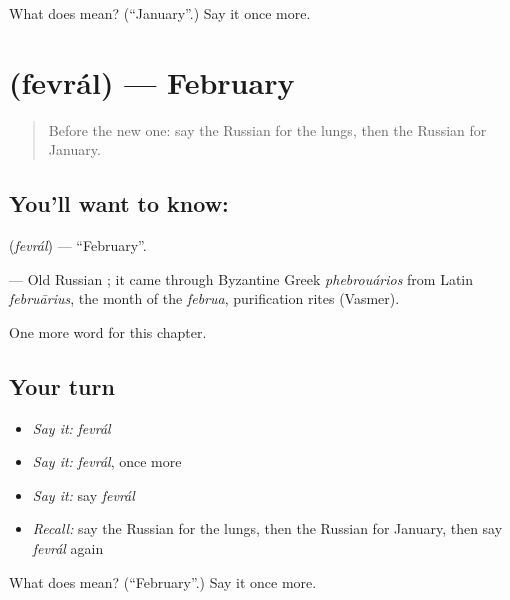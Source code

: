 \begin{tcolorbox}[breakable,colback=teal!4,colframe=teal!35!black,title={Before you move on}]
What does  mean? (\textquotedblleft{}January\textquotedblright{}.) Say it once more.
\end{tcolorbox}
\section[\texorpdfstring{\ru{февраль} (fevrál)}{февраль (fevrál)}]{ (fevrál) — February}

\label{lesson:RU-C181-fevral}



\begin{quote}
Before the new one: say the Russian for the lungs, then the Russian for January.
\end{quote}

\subsection*{You'll want to know: }
\textbf{} (\emph{fevrál}) — \textquotedblleft{}February\textquotedblright{}.

\begin{cousinweb}
\textbf{} — Old Russian \emph{}; it came through Byzantine Greek \emph{phebrouários} from Latin \emph{februārius}, the month of the \emph{februa}, purification rites (Vasmer).
\end{cousinweb}

\begin{grammarlens}[title={What you've built}]
One more word for this chapter.
\end{grammarlens}

\subsection*{Your turn}
\begin{itemize}
\raggedright
  \item \emph{Say it:} \emph{fevrál}
  \item \emph{Say it:} \emph{fevrál}, once more
  \item \emph{Say it:} say \emph{fevrál}
  \item \emph{Recall:} say the Russian for the lungs, then the Russian for January, then say \emph{fevrál} again
\end{itemize}

\begin{tcolorbox}[breakable,colback=teal!4,colframe=teal!35!black,title={Before you move on}]
What does  mean? (\textquotedblleft{}February\textquotedblright{}.) Say it once more.
\end{tcolorbox}
